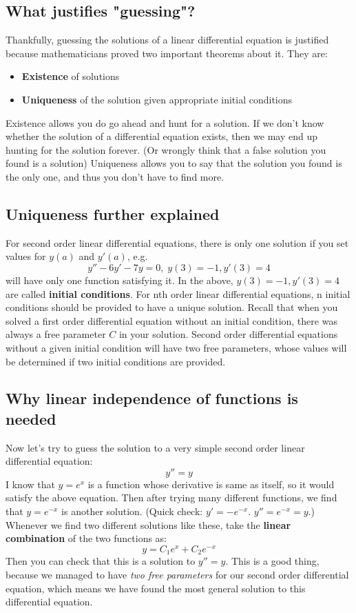 \documentclass[12pt]{report}
\begin{document}
\subsection*{What justifies "guessing"?}
Thankfully, guessing the solutions of a linear differential equation is justified because mathematicians proved two important theorems about it. They are:
\begin{itemize}
	\item \textbf{Existence} of solutions
	\item \textbf{Uniqueness} of the solution given appropriate initial conditions
\end{itemize}
Existence  allows you do go ahead and hunt for a solution. If we don't know whether the solution of a differential equation exists, then we may end up hunting for the solution forever. (Or wrongly think that a false solution you found is a solution)
Uniqueness allows you to say that the solution you found is the only one, and thus you don't have to find more.

\subsection*{Uniqueness further explained}
For second order linear differential equations, there is only one solution if you set values for $y(a)$ and $y'(a)$, e.g.
$$y''-6y'-7y=0, \; y(3)=-1, y'(3)=4$$ will have only one function satisfying it.
In the above, $y(3)=-1, y'(3)=4$ are called \textbf{initial conditions}.
For nth order linear differential equations, n initial conditions should be provided to have a unique solution.
Recall that when you solved a first order differential equation without an initial condition, there was always a free parameter $C$ in your solution.
Second order differential equations without a given initial condition will have two free parameters, whose values will be determined if two initial conditions are provided.

\subsection*{ Why linear independence of functions is needed}
Now let's try to guess the solution to a very simple second order linear differential equation:
$$y''=y$$
I know that $y=e^x$ is a function whose derivative is same as itself, so it would satisfy the above equation.
Then after trying many different functions, we find that $y=e^{-x}$ is another solution. (Quick check: $y'=-e^{-x}$. $y''=e^{-x}=y$.)
Whenever we find two different solutions like these, take the \textbf{linear combination} of the two functions as:
$$y= C_1 e^x + C_2 e^{-x}$$
Then you can check that this is a solution to $y''=y$. This is a good thing, because we managed to have \textit{two free parameters} for our second order differential equation, which means we have found the most general solution to this differential equation.
\end{document}
